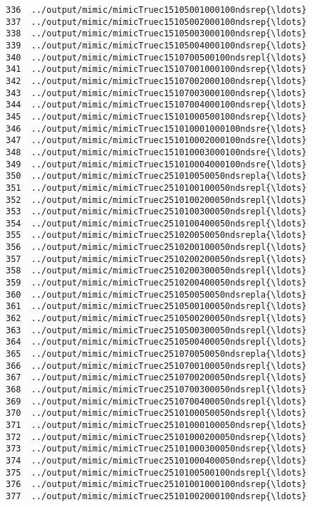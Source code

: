 \documentclass[11pt]{article}
\begin{document}
\begin{Verbatim}[commandchars=\\\{\}]
336  ../output/mimic/mimicTruec15105001000100ndsrep{\ldots}  
337  ../output/mimic/mimicTruec15105002000100ndsrep{\ldots}  
338  ../output/mimic/mimicTruec15105003000100ndsrep{\ldots}  
339  ../output/mimic/mimicTruec15105004000100ndsrep{\ldots}  
340  ../output/mimic/mimicTruec1510700500100ndsrepl{\ldots}  
341  ../output/mimic/mimicTruec15107001000100ndsrep{\ldots}  
342  ../output/mimic/mimicTruec15107002000100ndsrep{\ldots}  
343  ../output/mimic/mimicTruec15107003000100ndsrep{\ldots}  
344  ../output/mimic/mimicTruec15107004000100ndsrep{\ldots}  
345  ../output/mimic/mimicTruec15101000500100ndsrep{\ldots}  
346  ../output/mimic/mimicTruec151010001000100ndsre{\ldots}  
347  ../output/mimic/mimicTruec151010002000100ndsre{\ldots}  
348  ../output/mimic/mimicTruec151010003000100ndsre{\ldots}  
349  ../output/mimic/mimicTruec151010004000100ndsre{\ldots}  
350  ../output/mimic/mimicTruec251010050050ndsrepla{\ldots}  
351  ../output/mimic/mimicTruec2510100100050ndsrepl{\ldots}  
352  ../output/mimic/mimicTruec2510100200050ndsrepl{\ldots}  
353  ../output/mimic/mimicTruec2510100300050ndsrepl{\ldots}  
354  ../output/mimic/mimicTruec2510100400050ndsrepl{\ldots}  
355  ../output/mimic/mimicTruec251020050050ndsrepla{\ldots}  
356  ../output/mimic/mimicTruec2510200100050ndsrepl{\ldots}  
357  ../output/mimic/mimicTruec2510200200050ndsrepl{\ldots}  
358  ../output/mimic/mimicTruec2510200300050ndsrepl{\ldots}  
359  ../output/mimic/mimicTruec2510200400050ndsrepl{\ldots}  
360  ../output/mimic/mimicTruec251050050050ndsrepla{\ldots}  
361  ../output/mimic/mimicTruec2510500100050ndsrepl{\ldots}  
362  ../output/mimic/mimicTruec2510500200050ndsrepl{\ldots}  
363  ../output/mimic/mimicTruec2510500300050ndsrepl{\ldots}  
364  ../output/mimic/mimicTruec2510500400050ndsrepl{\ldots}  
365  ../output/mimic/mimicTruec251070050050ndsrepla{\ldots}  
366  ../output/mimic/mimicTruec2510700100050ndsrepl{\ldots}  
367  ../output/mimic/mimicTruec2510700200050ndsrepl{\ldots}  
368  ../output/mimic/mimicTruec2510700300050ndsrepl{\ldots}  
369  ../output/mimic/mimicTruec2510700400050ndsrepl{\ldots}  
370  ../output/mimic/mimicTruec2510100050050ndsrepl{\ldots}  
371  ../output/mimic/mimicTruec25101000100050ndsrep{\ldots}  
372  ../output/mimic/mimicTruec25101000200050ndsrep{\ldots}  
373  ../output/mimic/mimicTruec25101000300050ndsrep{\ldots}  
374  ../output/mimic/mimicTruec25101000400050ndsrep{\ldots}  
375  ../output/mimic/mimicTruec2510100500100ndsrepl{\ldots}  
376  ../output/mimic/mimicTruec25101001000100ndsrep{\ldots}  
377  ../output/mimic/mimicTruec25101002000100ndsrep{\ldots}  

\end{Verbatim}
\end{document}
